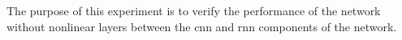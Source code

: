 
The purpose of this experiment is to verify the performance
of the network without nonlinear layers between the
\gls{cnn} and \gls{rnn} components of the network.
